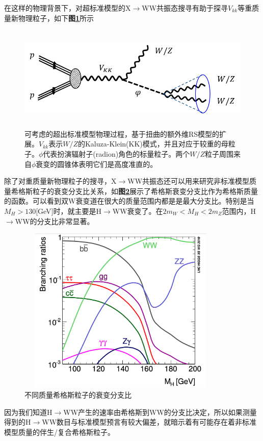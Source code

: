 在这样的物理背景下，对超标准模型的X$\to$WW共振态搜寻有助于探寻$V_{kk}$等重质量新物理粒子，如下\textbf{图\ref{fig:2.7}}所示
\begin{figure}[H]
 \centering
 \includegraphics[height=5cm, width=16cm]{pictures/Vkk.png}
  \caption{可考虑的超出标准模型物理过程，基于扭曲的额外维RS模型的扩展。$V_{kk}$表示$W/Z$的Kaluza-Klein(KK)模式，并且对应于较重的母粒子。$\phi$代表扮演辐射子(radion)角色的标量粒子。两个$W/Z$粒子周围来自$\phi$衰变的圆锥体表明它们是高度准直的。\cite{Detecting_a_Boosted_Diboson_Resonance}}
 \label{fig:2.7}
\end{figure}

除了对重质量新物理粒子的搜寻，X$\to$WW共振态还可以用来研究非标准模型质量希格斯粒子的衰变分支比关系，如\textbf{图\ref{fig:2.8}}展示了希格斯衰变分支比作为希格斯质量的函数。可以看到双W衰变道在很大的质量范围内都是是最大分支比。特别是当$M_H>130$[GeV]时，就主要是H$\to$WW衰变了。在$2m_W<M_H<2m_Z$范围内，H$\to$WW的分支比非常显著。
\begin{figure}[H]
 \centering
 \includegraphics[height=8cm, width=10cm]{pictures/XS-MH.png}
  \caption{不同质量希格斯粒子的衰变分支比\cite{john-alison}}
 \label{fig:2.8}
\end{figure}
因为我们知道H$\to$WW产⽣的速率由希格斯到WW的分⽀⽐决定，所以如果测量得到的H$\to$WW数目与标准模型预言有较大偏差，就暗示着有可能存在着非标准模型质量的伴生/复合希格斯粒子。

